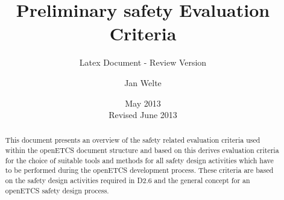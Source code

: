 \documentclass{template/openetcs_article}
\begin{document}
\frontmatter
{}




\title{Preliminary safety Evaluation Criteria}

\subtitle{Latex Document - Review Version}

\date{May 2013\\Revised June 2013}


\author{Jan Welte}





\begin{abstract}
  This document presents an overview of the safety related evaluation criteria used within the openETCS document structure and based on this derives evaluation criteria for the choice of suitable tools and methods for all safety design activities which have to be performed during the openETCS development process. These criteria are based on the safety design activities required in D2.6 and the general concept for an openETCS safety design process. 
\end{abstract}

\maketitle
\tableofcontents
\listoffiguresandtables
\newpage

\end{document}
